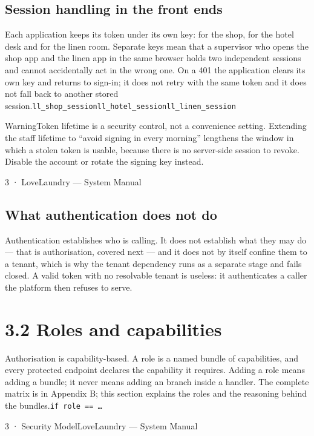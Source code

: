 \documentclass[11pt,a4paper,oneside]{book}
\begin{document}
\subsection*{Session handling in the front ends}
Each application keeps its token under its own key:  for the shop,  for the hotel desk and  for the linen room. Separate keys mean that a supervisor who opens the shop app and the linen app in the same browser holds two independent sessions and cannot accidentally act in the wrong one. On a 401 the application clears its own key and returns to sign-in; it does not retry with the same token and it does not fall back to another stored session.\texttt{ll\_shop\_session}\texttt{ll\_hotel\_session}\texttt{ll\_linen\_session}

\begin{notebox}WarningToken lifetime is a security control, not a convenience setting. Extending the staff lifetime to “avoid signing in every morning” lengthens the window in which a stolen token is usable, because there is no server-side session to revoke. Disable the account or rotate the signing key instead.\end{notebox}
3 · LoveLaundry — System Manual

\subsection*{What authentication does not do}
Authentication establishes who is calling. It does not establish what they may do — that is authorisation, covered next — and it does not by itself confine them to a tenant, which is why the tenant dependency runs as a separate stage and fails closed. A valid token with no resolvable tenant is useless: it authenticates a caller the platform then refuses to serve.

\section{3.2 Roles and capabilities}
Authorisation is capability-based. A role is a named bundle of capabilities, and every protected endpoint declares the capability it requires. Adding a role means adding a bundle; it never means adding an  branch inside a handler. The complete matrix is in Appendix B; this section explains the roles and the reasoning behind the bundles.\texttt{if role == …}

3 · Security ModelLoveLaundry — System Manual
\end{document}
